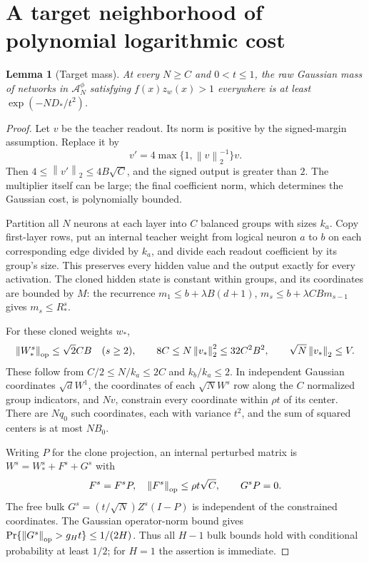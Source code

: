 \documentclass[11pt]{article}
\newtheorem{lemma}[theorem]{Lemma}
\newcommand{\norm}[1]{\left\lVert#1\right\rVert}
\begin{document}
\section{A target neighborhood of polynomial logarithmic cost}
\begin{lemma}[Target mass]\label{lem:mass}
At every $N\ge C$ and $0<t\le1$, the raw Gaussian mass of networks in
$\mathcal A_N^\phi$ satisfying $f(x)z_w(x)>1$ everywhere is at least
$\exp(-ND_*/t^2)$.
\end{lemma}
\begin{proof}
Let $v$ be the teacher readout. Its norm is positive by the signed-margin
assumption. Replace it by
\[
 v'=4\max\{1,\norm v_2^{-1}\}v.
\]
Then $4\le\norm{v'}_2\le4B\sqrt C$, and the signed output is greater
than $2$. The multiplier itself can be large; the final coefficient norm,
which determines the Gaussian cost, is polynomially bounded.

Partition all $N$ neurons at each layer into $C$ balanced groups with
sizes $k_a$. Copy first-layer rows, put an internal teacher weight from
logical neuron $a$ to $b$ on each corresponding edge divided by $k_a$,
and divide each readout coefficient by its group's size. This preserves
every hidden value and the output exactly for every activation.
The cloned hidden state is constant within groups, and its coordinates
are bounded by $M$: the recurrence
$m_1\le b+\lambda B(d+1)$,
$m_s\le b+\lambda CBm_{s-1}$ gives $m_s\le R_*^s$.

For these cloned weights $w_*$,
\[
 \norm{W_*^s}_{\rm op}\le\sqrt2 CB\quad(s\ge2),\qquad
 8C\le N\norm{v_*}_2^2\le32C^2B^2,\qquad
 \sqrt N\norm{v_*}_2\le V.
\]
These follow from $C/2\le N/k_a\le2C$ and $k_b/k_a\le2$.
In independent Gaussian coordinates $\sqrt dW^1$, the coordinates of
each $\sqrt N W^s$ row along the $C$ normalized group indicators, and
$Nv$, constrain every coordinate within $\rho t$ of its center.
There are $Nq_0$ such coordinates, each with variance $t^2$, and the sum
of squared centers is at most $NB_0$.

Writing $P$ for the clone projection, an internal perturbed matrix is
$W^s=W_*^s+F^s+G^s$ with
\[
 F^s=F^sP,\quad \norm{F^s}_{\rm op}\le\rho t\sqrt C,
 \qquad G^sP=0.
\]
The free bulk $G^s=(t/\sqrt N)Z^s(I-P)$ is independent of the constrained
coordinates. The Gaussian operator-norm bound gives
$\Pr\{\norm{G^s}_{\rm op}>g_Ht\}\le1/(2H)$.
Thus all $H-1$ bulk bounds hold with conditional probability at least
$1/2$; for $H=1$ the assertion is immediate.


\end{proof}
\end{document}

